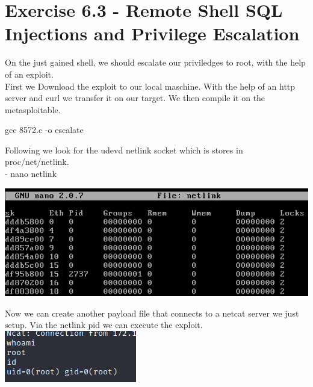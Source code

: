 \documentclass[a4paper,10pt]{article}
\begin{document}
\section{Exercise 6.3 - Remote Shell SQL Injections and Privilege Escalation}
On the just gained shell, we should escalate our priviledges to root, with the help of an exploit.\\
First we Download the exploit to our local maschine. With the help of an http server and curl we transfer it on our target. 
We then compile it on the metasploitable.
\begin{center}
gcc 8572.c -o escalate
\end{center}
Following we look for the udevd netlink
socket which is stores in proc/net/netlink.\\
- nano netlink
\begin{center}
 \includegraphics[scale=0.5]{link.png}
\end{center}
Now we can create another payload file that connects to a netcat server we just setup.
Via the netlink pid we can execute the exploit.\\
\includegraphics[scale=0.5]{root.png}
\end{document}
